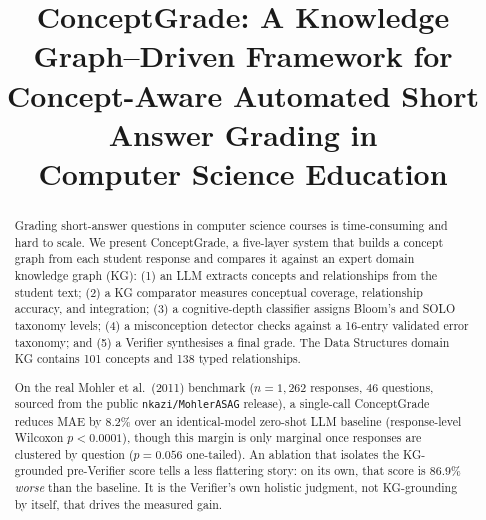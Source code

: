 \documentclass[conference]{IEEEtran}
\begin{document}
\title{ConceptGrade: A Knowledge Graph--Driven Framework for\\
       Concept-Aware Automated Short Answer Grading in\\
       Computer Science Education}

\author{
}

\maketitle

\begin{abstract}
Grading short-answer questions in computer science courses is
time-consuming and hard to scale. We present ConceptGrade, a five-layer
system that builds a concept graph from each student response and
compares it against an expert domain knowledge graph (KG): (1) an LLM
extracts concepts and relationships from the student text; (2) a KG
comparator measures conceptual coverage, relationship accuracy, and
integration; (3) a cognitive-depth classifier assigns Bloom's and SOLO
taxonomy levels; (4) a misconception detector checks against a
16-entry validated error taxonomy; and (5) a Verifier synthesises a
final grade. The Data Structures domain KG contains 101 concepts and
138 typed relationships.

On the real Mohler et al.\ (2011) benchmark ($n=1{,}262$ responses, 46
questions, sourced from the public \texttt{nkazi/MohlerASAG} release), a
single-call ConceptGrade reduces MAE by $8.2\%$ over an identical-model
zero-shot LLM baseline (response-level Wilcoxon $p<0.0001$), though this
margin is only marginal once responses are clustered by question
($p=0.056$ one-tailed). An ablation that isolates the KG-grounded
pre-Verifier score tells a less flattering story: on its own, that score
is $86.9\%$ \emph{worse} than the baseline. It is the Verifier's own
holistic judgment, not KG-grounding by itself, that drives the measured
gain.


\end{abstract}
\end{document}
